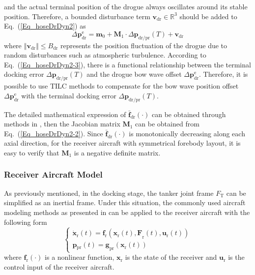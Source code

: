 and the actual terminal position of the drogue always oscillates around
its stable position. Therefore, a bounded disturbance term $\mathbf{v}_{\text{dr}}\in%
\mathbb{R}%
^{3}$ should be added to Eq.~(\ref{Eq_hoseDrDyn2}) as 
\begin{equation}
\Delta{\mathbf{p}}_{\text{dr}}^{\text{e}}=\mathbf{m}_{0}+\mathbf{M}_{1}\cdot\Delta{\mathbf{p}}_{\text{dr/pr}}\left(T\right)+\mathbf{v}_{\text{dr}}\label{Eq_hoseDrDyn2-3}
\end{equation}
where $\left\Vert \mathbf{v}_{\text{dr}}\right\Vert \leq B_{\text{dr}}$
represents the position fluctuation of the drogue due to random disturbances
such as atmospheric turbulence. According to Eq.~(\ref{Eq_hoseDrDyn2-3}),
there is a functional relationship between the terminal docking error
$\Delta{\mathbf{p}}_{\text{dr/pr}}\left(T\right)$ and the drogue
bow wave offset $\Delta{\mathbf{p}}_{\text{dr}}^{\text{e}}$. Therefore,
it is possible to use TILC methods to compensate for the bow wave
position offset $\Delta{\mathbf{p}}_{\text{dr}}^{\text{e}}$ with
the terminal docking error $\Delta{\mathbf{p}}_{\text{dr/pr}}\left(T\right)$.

The detailed mathematical expression of ${\mathbf{\bar{f}}}_{\text{dr}}\left(\cdot\right)$
can be obtained through methods in \cite{dai2016modeling}, then the
Jacobian matrix $\mathbf{M}_{1}$ can be obtained from Eq.~(\ref{Eq_hoseDrDyn2-2}).
Since ${\mathbf{\bar{f}}}_{\text{dr}}\left(\cdot\right)$ is monotonically
decreasing along each axial direction, for the receiver aircraft with
symmetrical forebody layout, it is easy to verify that $\mathbf{M}_{1}$
is a negative definite matrix.

\subsubsection{Receiver Aircraft Model}

As previously mentioned, in the docking stage, the tanker joint frame
$F_{\text{T}}$ can be simplified as an inertial frame. Under this
situation, the commonly used aircraft modeling methods as presented
in \cite{AirContrl} can be applied to the receiver aircraft with
the following form
\begin{equation}
\left\{ \begin{array}{l}
{\mathbf{{\dot{x}}}}_{\text{r}}\left(t\right)={\mathbf{f}}_{\text{r}}\left({\mathbf{x}}_{\text{r}}{\left(t\right),\mathbf{F}}_{\text{r}}{\left(t\right),}\boldsymbol{u}_{\text{r}}\left(t\right)\right)\\
\mathbf{p}{_{\text{pr}}}\left(t\right)={\mathbf{g}_{\text{pr}}}\left({\mathbf{x}}_{\text{r}}\left(t\right)\right)
\end{array}\right.\label{Eq-rec}
\end{equation}
where ${\mathbf{f}}_{\text{r}}\left(\cdot\right)$ is a nonlinear
function, ${\mathbf{x}}_{\text{r}}$ is the state of the receiver
and $\mathbf{u}_{\text{r}}$ is the control input of the receiver
aircraft.


